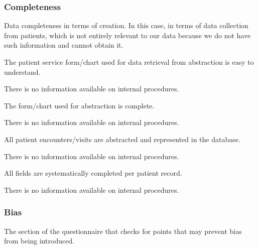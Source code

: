 \subsubsection{Completeness}

Data completeness in terms of creation.
In this case, in terms of data collection from patients, which is not entirely relevant to our data because we do not have such information and cannot obtain it.

\begin{QandA}
    \item The patient service form/chart used for data retrieval from abstraction is easy to understand.
    \begin{answered}
        There is no information available on internal procedures.
    \end{answered}

    \item The form/chart used for abstraction is complete.
    \begin{answered}
        There is no information available on internal procedures.
    \end{answered}

    \item All patient encounters/visits are abstracted and represented in the database.
    \begin{answered}
        There is no information available on internal procedures.
    \end{answered}

    \item All fields are systematically completed per patient record.
    \begin{answered}
        There is no information available on internal procedures.
    \end{answered}

\end{QandA}

\subsubsection{Bias}

The section of the questionnaire that checks for points that may prevent bias from being introduced.

